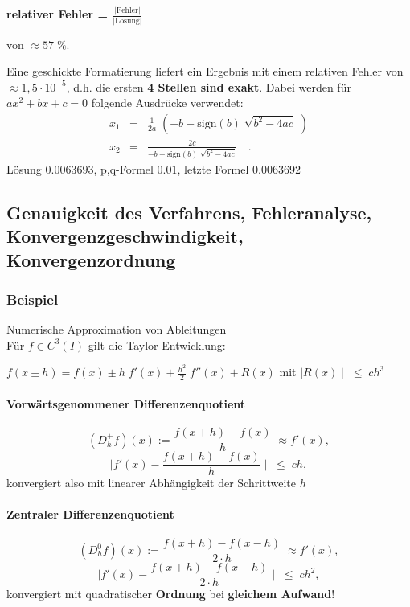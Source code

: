 \documentclass[ngerman,fontsize=11pt, paper=a4, parskip=half, titlepage=true, toc=bib]{scrbook}
\begin{document}
    {\bf{relativer} \bf{Fehler} = $\frac{|\mbox{Fehler}|}{|\mbox{Lösung}|}$}
    
    von        $\approx 57 \; \%$.
    
    Eine geschickte Formatierung liefert ein Ergebnis mit einem relativen Fehler von $\approx 1,5 \cdot
    10^{-5}$, d.h. die ersten \textbf{4 Stellen sind exakt}. 
    Dabei werden für $ax^2 + bx + c = 0$ folgende Ausdrücke verwendet:
    \begin{align*}
    	x_1 &=& \tfrac{1}{2a} \; (- b - \mbox{sign}(b) \; \sqrt{b^2 -
    		4ac}\;)\\
    	x_2& =  &\tfrac{2c}{- b - \mbox{sign}(b) \; \sqrt{b^2 - 4ac}} \quad .
    \end{align*}
    Lösung $0.0063693$, p,q-Formel $0.01$,
    letzte Formel $0.0063692$
    
     \subsection*{Genauigkeit des Verfahrens, Fehleranalyse,
     Konvergenzgeschwindigkeit, Konvergenzordnung}
     
     \subsubsection{Beispiel}
      Numerische Approximation von Ableitungen \\
     Für $f \in C^3(I)$ gilt die Taylor-Entwicklung:
     
     $f(x \pm h) = f(x) \pm h \; f'(x) + \frac{h^2}{2} \; f''(x) +
     R(x)$ mit $\mid R(x) \mid \; \leq \; c   h^3$
     
     \paragraph{Vorwärtsgenommener Differenzenquotient}
     $$ (D_h^+f)(x):= \frac{f(x + h) - f(x)}{h} \; \approx f'(x), $$
     $$\mid f'(x) - \frac{f(x + h) - f(x)}{h} \mid \; \leq \; c h, $$
     konvergiert also mit linearer Abhängigkeit der
     Schrittweite $h$  
     \paragraph{Zentraler Differenzenquotient}
     $$(D_h^0f) (x):= \frac{f(x + h) - f(x-h)}{2 \cdot h} \; \approx
     f'(x),$$
     $$\mid f'(x) - \frac{f(x + h) - f(x - h)}{2 \cdot h} \mid \;
     \leq \; c h^2, $$
     konvergiert mit quadratischer \textbf{Ordnung} bei
     \textbf{gleichem Aufwand}!
    
\end{document}
